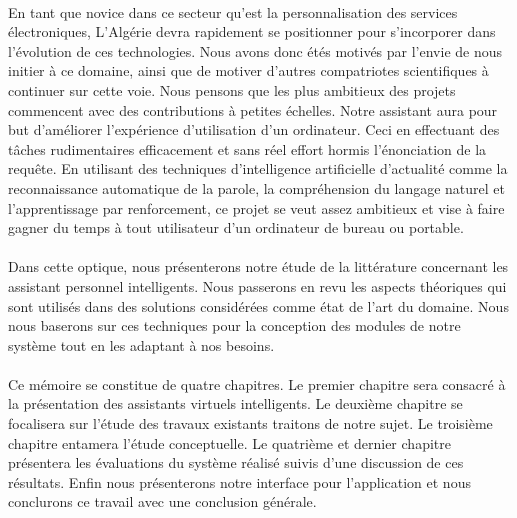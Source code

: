\paragraph{}
En tant que novice dans ce secteur qu'est la personnalisation des services électroniques, L'Algérie devra rapidement se positionner pour s'incorporer dans l'évolution de ces technologies. Nous avons donc étés motivés par l'envie de nous initier à ce domaine, ainsi que de motiver d'autres compatriotes scientifiques à continuer sur cette voie. Nous pensons que les plus ambitieux des projets commencent avec des contributions à petites échelles. Notre assistant aura pour but d'améliorer l'expérience d'utilisation d'un ordinateur. Ceci en effectuant des tâches rudimentaires efficacement et sans réel effort hormis l'énonciation de la requête. En utilisant des techniques d’intelligence artificielle d'actualité comme la reconnaissance automatique de la parole, la compréhension du langage naturel et l'apprentissage par renforcement, ce projet se veut assez ambitieux et vise à faire gagner du temps à tout utilisateur d'un ordinateur de bureau ou portable.
	
\paragraph{}
Dans cette optique, nous présenterons notre étude de la littérature concernant les assistant personnel intelligents. Nous passerons en revu les aspects théoriques qui sont utilisés dans des solutions considérées comme état de l'art du domaine. Nous nous baserons sur ces techniques pour la conception des modules de notre système tout en les adaptant à nos besoins. 

\paragraph{}
Ce mémoire se constitue de quatre chapitres. Le premier chapitre sera consacré à la présentation des assistants virtuels intelligents. Le deuxième chapitre se focalisera sur l'étude des travaux existants traitons de notre sujet. Le troisième chapitre entamera l'étude conceptuelle. Le quatrième et dernier chapitre présentera les évaluations du système réalisé suivis d'une discussion de ces résultats. Enfin nous présenterons notre interface pour l'application et nous conclurons ce travail avec une conclusion générale.